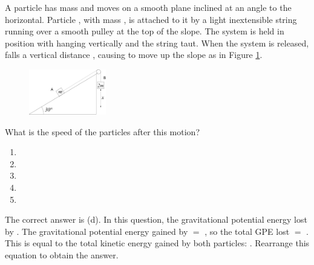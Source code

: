 
\begin{problem} 
{A particle  has mass  and moves on a smooth plane inclined at an angle  to the horizontal. Particle , with mass , is attached to it by a light inextensible string running over a smooth pulley at the top of the slope. The system is held in position with  hanging vertically and the string taut. When the system is released,  falls a vertical distance , causing  to move up the slope as in Figure \ref{fig:Dynamics_masses_slope_30}.
\begin{figure}[h]
	\centering
	\includegraphics[width=0.3\textwidth]{../../../figures/Dynamics_masses_slope_30}
	\caption{}\label{fig:Dynamics_masses_slope_30}
\end{figure}
\nl
What is the speed of the particles after this motion?
\begin{enumerate}
	\item {}
	\item {}
	\item {}
	\item {} \answer
	\item {}
\end{enumerate}
}
{}
{The correct answer is (d). In this question, the gravitational potential energy lost by . The gravitational potential energy gained by  $=$ , so the total GPE lost $=$ . This is equal to the total kinetic energy gained by both particles: . Rearrange this equation to obtain the answer.
}
\end{problem}